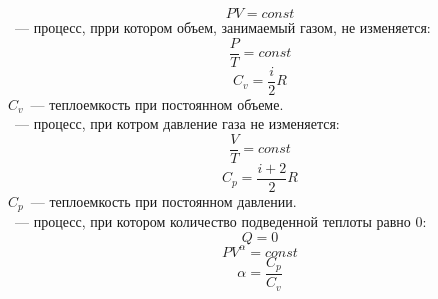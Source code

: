 \begin{equation}
PV = const
\end{equation}
~--- процесс, прри котором объем, занимаемый газом, не изменяется:
\begin{equation}
\frac{P}{T} = const
\end{equation}
\begin{equation}
C_v = \frac{i}{2}R
\end{equation}
$C_v$~--- теплоемкость при постоянном объеме.\\
~--- процесс, при котром давление газа не изменяется:
\begin{equation}
\frac{V}{T} = const
\end{equation}
\begin{equation}
C_p = \frac{i+2}{2}R
\end{equation}
$C_p$~--- теплоемкость при постоянном давлении.\\
~--- процесс, при котором количество подведенной теплоты равно 0:
\begin{equation}
Q=0
\end{equation}
\begin{equation}
P V^\alpha = const
\end{equation}
\begin{equation}
\alpha = \frac{C_p}{C_v}
\end{equation}